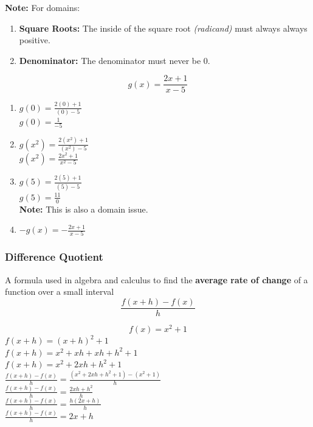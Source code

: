 \textbf{Note: } For domains:


\begin{enumerate}
\item \textbf{Square Roots: } The inside of the square root \textit{(radicand)} must always always positive.
\item \textbf{Denominator: }  The denominator must never be 0.
\end{enumerate}

\begin{example}[Fractions]
  $$g(x) = \frac{2x + 1}{x - 5}$$
  \begin{enumerate}
  \item $g(0) = \frac{2(0) + 1}{(0) - 5}$ \\
    $g(0) = \frac{1}{-5}$
  \item $g(x^2) = \frac{2(x^2) + 1}{(x^2) - 5}$ \\
    $g(x^2) = \frac{2x^2 + 1}{x^2 - 5}$
  \item $g(5) = \frac{2(5) + 1}{(5) - 5}$ \\
    $g(5) = \frac{11}{0}$ \\
    \textbf{Note: } This is also a domain issue.
  \item $-g(x) = - \frac{2x + 1}{x - 5}$
  \end{enumerate}
\end{example}

\subsubsection{Difference Quotient}
\begin{definition}
  A formula used in algebra and calculus to find the \textbf{average rate of change} of a function over a small interval
  $$\frac{f(x + h) - f(x)}{h}$$
\end{definition}

\begin{example}[Example]
  $$f(x) = x^2 + 1$$
  $f(x + h) = (x + h)^2 + 1$ \\
  $f(x + h) = x^2 + xh + xh + h^2 + 1$ \\
  $f(x + h) = x^2 + 2xh + h^2 + 1$ \\


  $\frac{f(x + h) - f(x)}{h} = \frac{(x^2 + 2xh + h^2 + 1) - (x^2 + 1)}{h}$ \\
  $\frac{f(x + h) - f(x)}{h} = \frac{2xh + h^2}{h}$ \\
  $\frac{f(x + h) - f(x)}{h} = \frac{h(2x + h)}{h}$ \\
  $\frac{f(x + h) - f(x)}{h} = 2x + h$ \\
\end{example}
